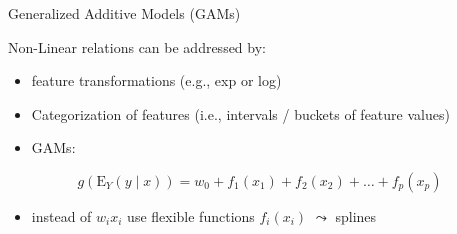 \documentclass[aspectratio=169]{../latex_main/tntbeamer}  %
\begin{document}

\begin{frame}{Generalized Additive Models (GAMs)}

Non-Linear relations can be addressed by:
    \begin{itemize}
        \item feature transformations (e.g., exp or log)
        \item Categorization of features (i.e., intervals / buckets of feature values)
        \item GAMs:
    \end{itemize}
    
    $$g(\mathrm{E}_Y (y\mid x)) = w_0 + f_1(x_1) + f_2(x_2) + \ldots + f_p(x_p)$$
    
    \begin{itemize}
        \item instead of $w_i x_i$ use flexible functions $f_i(x_i)$ $\leadsto$ splines
    \end{itemize}

\end{frame}

\end{document}
